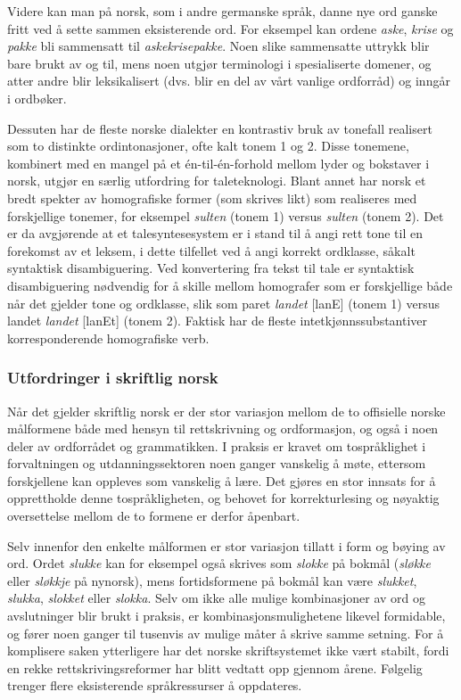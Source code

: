 \begin{multicols}{2}
Videre kan man på norsk, som i andre germanske språk, danne nye ord ganske fritt ved å sette sammen eksisterende ord. For eksempel kan ordene \textit{aske}, \textit{krise} og \textit{pakke} bli sammensatt til \textit{askekrisepakke}.
Noen slike sammensatte uttrykk blir bare brukt av og til, mens noen utgjør terminologi i spesialiserte domener, og atter andre blir leksikalisert (dvs. blir en del av vårt vanlige ordforråd) og inngår i ordbøker.

Dessuten har de fleste norske dialekter en kontrastiv bruk av tonefall realisert som to distinkte ordintonasjoner, ofte kalt tonem 1 og 2. Disse tonemene, kombinert med en mangel på et én-til-én-forhold mellom lyder og bokstaver i norsk, utgjør en særlig utfordring for taleteknologi. Blant annet har norsk et bredt spekter av homografiske former (som skrives likt) som realiseres med forskjellige tonemer, for eksempel  \textit{sulten} (tonem 1) versus \textit{sulten} (tonem 2). Det er da avgjørende at et talesyntesesystem er i stand til å angi rett tone til en forekomst av et leksem, i dette tilfellet ved å angi korrekt ordklasse, såkalt syntaktisk disambiguering. 
Ved konvertering fra tekst til tale er syntaktisk disambiguering nødvendig for å skille mellom homografer som er forskjellige både når det gjelder tone og ordklasse, slik som paret \textit{landet} {[}lanE{]} (tonem 1) versus landet \textit{landet} {[}lanEt{]} (tonem 2). 
Faktisk har de fleste intetkjønnssubstantiver korresponderende homografiske verb.

\subsubsection{Utfordringer i skriftlig norsk}

Når det gjelder skriftlig norsk er der stor variasjon mellom de to offisielle norske målformene både med hensyn til rettskrivning og ordformasjon, og også i noen deler av ordforrådet og grammatikken. 
I praksis er kravet om tospråklighet i forvaltningen og utdanningssektoren noen ganger vanskelig å møte, ettersom forskjellene kan oppleves som vanskelig å lære. Det gjøres en stor innsats for å opprettholde denne tospråkligheten, og behovet for korrekturlesing og nøyaktig oversettelse mellom de to formene er derfor åpenbart.

Selv innenfor den enkelte målformen er stor variasjon tillatt i form og bøying av ord. Ordet \textit{slukke} kan for eksempel også skrives som \textit{slokke} på bokmål (\textit{sløkke} eller \textit{sløkkje} på nynorsk), mens fortidsformene på bokmål kan være \textit{slukket}, \textit{slukka}, \textit{slokket} eller \textit{slokka}. 
Selv om ikke alle mulige kombinasjoner av ord og avslutninger blir brukt i praksis, er kombinasjonsmulighetene likevel formidable, og fører noen ganger til tusenvis av mulige måter å skrive samme setning.
For å komplisere saken ytterligere har det norske skriftsystemet ikke vært stabilt, fordi en rekke rettskrivingsreformer har blitt vedtatt opp gjennom årene. Følgelig trenger flere eksisterende språkressurser å oppdateres.


\end{multicols}
